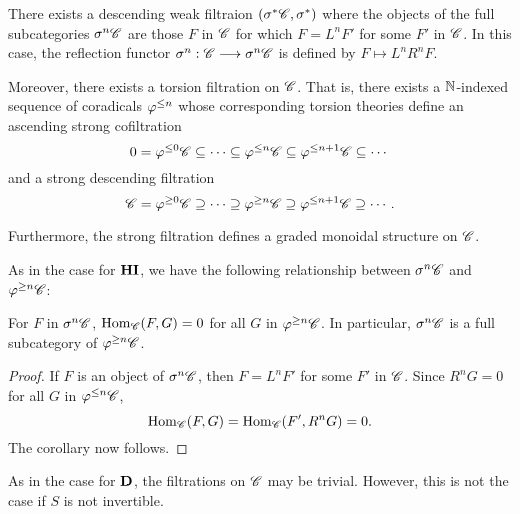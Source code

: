 \begin{thm}\label{thm_sum_heart}
There exists a descending weak filtraion $(\sigma^{*}\mathscr{C}, 
\sigma^{*})$ where the objects of the full subcategories 
$\sigma^{n}\mathscr{C}$ are those $F$ in $\mathscr{C}$ for which $F = L^nF'$ 
for some $F'$ in $\mathscr{C}$. In this case, the reflection functor 
$\sigma^{n}: \mathscr{C} \longrightarrow \sigma^{n}\mathscr{C}$ is defined by $F \mapsto 
L^nR^n F$.

Moreover, there exists a torsion filtration on $\mathscr{C}$. That is, 
there exists a $\mathbb{N}$-indexed sequence of coradicals $\varphi^{\leq n}$ 
whose corresponding torsion theories define an ascending strong 
cofiltration
\[
0 = \varphi^{\leq 0}\mathscr{C} \subseteq \cdots \subseteq \varphi^{\leq n}\mathscr{C}
   \subseteq \varphi^{\leq n + 1}\mathscr{C} \subseteq \cdots
\]
and a strong descending filtration
\[
\mathscr{C} = \varphi^{\geq 0}\mathscr{C} \supseteq \cdots \supseteq \varphi^{\geq n}\mathscr{C}
\supseteq \varphi^{\leq n + 1}\mathscr{C} \supseteq \cdots.
\]

Furthermore, the strong filtration defines a graded monoidal 
structure on $\mathscr{C}$.
\end{thm}
\noproof

As in the case for $\mathbf{HI}$, we have the following relationship 
between $\sigma^{n}\mathscr{C}$ and $\varphi^{\geq n}\mathscr{C}$:

\begin{cor}\label{cor_sg_sub_prerad}
For $F$ in $\sigma^{n}\mathscr{C}$, $\mathrm{Hom}_{\mathscr{C}}(F, G) = 0$ for
all $G$ in $\varphi^{\geq n}\mathscr{C}$. In particular, $\sigma^{n}\mathscr{C}$
is a full subcategory of $\varphi^{\geq n}\mathscr{C}$.
\end{cor}
\begin{proof}
If $F$ is an object of $\sigma^{n}\mathscr{C}$, then $F = L^n F'$ for
some $F'$ in $\mathscr{C}$. Since $R^n G = 0$ for all $G$ in 
$\varphi^{\leq n}\mathscr{C}$,
\[
\mathrm{Hom}_{\mathscr{C}}(F, G) = \mathrm{Hom}_{\mathscr{C}}(F', R^n G) = 0.
\]
The corollary now follows.
\end{proof}

As in the case for $\mathbf{D}$, the filtrations on $\mathscr{C}$ may be
trivial. However, this is not the case if $S$ is not invertible.

